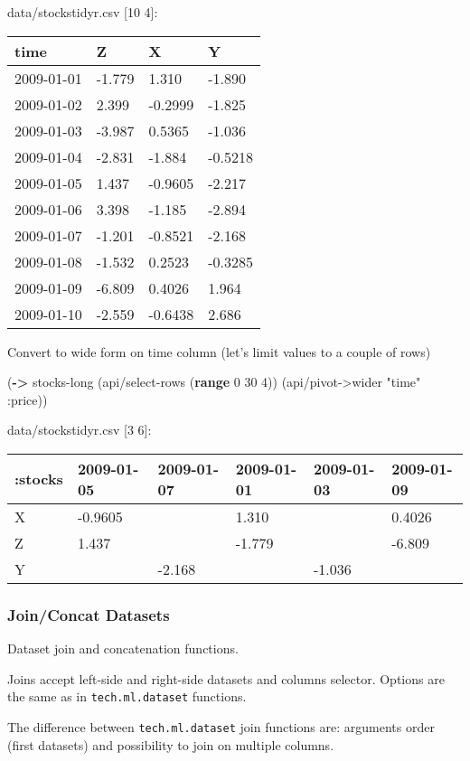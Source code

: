 \documentclass[]{article}
\newenvironment{Shaded}{\begin{snugshade}}{\end{snugshade}}
\newcommand{\KeywordTok}[1]{\textcolor[rgb]{0.13,0.29,0.53}{\textbf{#1}}}
\newcommand{\DecValTok}[1]{\textcolor[rgb]{0.00,0.00,0.81}{#1}}
\newcommand{\StringTok}[1]{\textcolor[rgb]{0.31,0.60,0.02}{#1}}
\newcommand{\AttributeTok}[1]{\textcolor[rgb]{0.77,0.63,0.00}{#1}}
\newcommand{\NormalTok}[1]{#1}
\begin{document}
data/stockstidyr.csv {[}10 4{]}:

\begin{longtable}[]{@{}llll@{}}
\toprule
time & Z & X & Y\tabularnewline
\midrule
\endhead
2009-01-01 & -1.779 & 1.310 & -1.890\tabularnewline
2009-01-02 & 2.399 & -0.2999 & -1.825\tabularnewline
2009-01-03 & -3.987 & 0.5365 & -1.036\tabularnewline
2009-01-04 & -2.831 & -1.884 & -0.5218\tabularnewline
2009-01-05 & 1.437 & -0.9605 & -2.217\tabularnewline
2009-01-06 & 3.398 & -1.185 & -2.894\tabularnewline
2009-01-07 & -1.201 & -0.8521 & -2.168\tabularnewline
2009-01-08 & -1.532 & 0.2523 & -0.3285\tabularnewline
2009-01-09 & -6.809 & 0.4026 & 1.964\tabularnewline
2009-01-10 & -2.559 & -0.6438 & 2.686\tabularnewline
\bottomrule
\end{longtable}

Convert to wide form on time column (let's limit values to a couple of
rows)

\begin{Shaded}
\begin{Highlighting}[]
\NormalTok{(}\KeywordTok{->}\NormalTok{ stocks-long}
\NormalTok{    (api/select-rows (}\KeywordTok{range} \DecValTok{0} \DecValTok{30} \DecValTok{4}\NormalTok{))}
\NormalTok{    (api/pivot->wider }\StringTok{"time"} \AttributeTok{:price}\NormalTok{))}
\end{Highlighting}
\end{Shaded}

data/stockstidyr.csv {[}3 6{]}:

\begin{longtable}[]{@{}llllll@{}}
\toprule
:stocks & 2009-01-05 & 2009-01-07 & 2009-01-01 & 2009-01-03 &
2009-01-09\tabularnewline
\midrule
\endhead
X & -0.9605 & & 1.310 & & 0.4026\tabularnewline
Z & 1.437 & & -1.779 & & -6.809\tabularnewline
Y & & -2.168 & & -1.036 &\tabularnewline
\bottomrule
\end{longtable}

\subsubsection{Join/Concat Datasets}\label{joinconcat-datasets}

Dataset join and concatenation functions.

Joins accept left-side and right-side datasets and columns selector.
Options are the same as in \texttt{tech.ml.dataset} functions.

The difference between \texttt{tech.ml.dataset} join functions are:
arguments order (first datasets) and possibility to join on multiple
columns.
\end{document}
